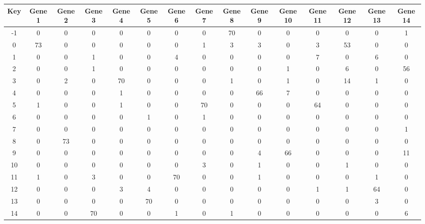 \begin{tabular}{|c|c|c|c|c|c|c|c|c|c|c|c|c|c|c|}
\hline
Key & Gene 1 & Gene 2 & Gene 3 & Gene 4 & Gene 5 & Gene 6 & Gene 7 & Gene 8 & Gene 9 & Gene 10 & Gene 11 & Gene 12 & Gene 13 & Gene 14 \\
\hline
-1 & 0 & 0 & 0 & 0 & 0 & 0 & 0 & 70 & 0 & 0 & 0 & 0 & 0 & 1 \\
0 & 73 & 0 & 0 & 0 & 0 & 0 & 1 & 3 & 3 & 0 & 3 & 53 & 0 & 0 \\
1 & 0 & 0 & 1 & 0 & 0 & 4 & 0 & 0 & 0 & 0 & 7 & 0 & 6 & 0 \\
2 & 0 & 0 & 1 & 0 & 0 & 0 & 0 & 0 & 0 & 1 & 0 & 6 & 0 & 56 \\
3 & 0 & 2 & 0 & 70 & 0 & 0 & 0 & 1 & 0 & 1 & 0 & 14 & 1 & 0 \\
4 & 0 & 0 & 0 & 1 & 0 & 0 & 0 & 0 & 66 & 7 & 0 & 0 & 0 & 0 \\
5 & 1 & 0 & 0 & 1 & 0 & 0 & 70 & 0 & 0 & 0 & 64 & 0 & 0 & 0 \\
6 & 0 & 0 & 0 & 0 & 1 & 0 & 1 & 0 & 0 & 0 & 0 & 0 & 0 & 0 \\
7 & 0 & 0 & 0 & 0 & 0 & 0 & 0 & 0 & 0 & 0 & 0 & 0 & 0 & 1 \\
8 & 0 & 73 & 0 & 0 & 0 & 0 & 0 & 0 & 0 & 0 & 0 & 0 & 0 & 0 \\
9 & 0 & 0 & 0 & 0 & 0 & 0 & 0 & 0 & 4 & 66 & 0 & 0 & 0 & 11 \\
10 & 0 & 0 & 0 & 0 & 0 & 0 & 3 & 0 & 1 & 0 & 0 & 1 & 0 & 0 \\
11 & 1 & 0 & 3 & 0 & 0 & 70 & 0 & 0 & 1 & 0 & 0 & 0 & 1 & 0 \\
12 & 0 & 0 & 0 & 3 & 4 & 0 & 0 & 0 & 0 & 0 & 1 & 1 & 64 & 0 \\
13 & 0 & 0 & 0 & 0 & 70 & 0 & 0 & 0 & 0 & 0 & 0 & 0 & 3 & 0 \\
14 & 0 & 0 & 70 & 0 & 0 & 1 & 0 & 1 & 0 & 0 & 0 & 0 & 0 & 6 \\
\hline
\end{tabular}